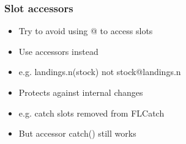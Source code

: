 \documentclass{beamer}%
\begin{document}
%
%
\begin{frame}
  \frametitle{Slot accessors}
      \begin{itemize}
	 \item<2-> Try to avoid using @ to access slots
	 \item<3-> Use accessors instead
	 \item<4-> e.g. landings.n(stock) not stock@landings.n
	 \item<5-> Protects against internal changes
	 \item<6-> e.g. catch slots removed from FLCatch
	 \item<7-> But accessor catch() still works
      \end{itemize}
\end{frame}
\end{document}
